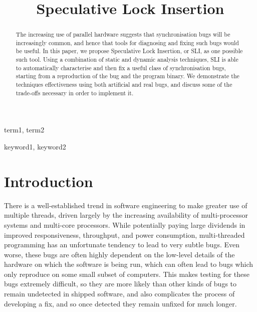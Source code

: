 \documentclass[10pt,twocolumn,preprint,natbib,authoryear]{sigplanconf}
\begin{document}
\copyrightdata{[to be supplied]} 


\title{Speculative Lock Insertion}

\authorinfo{}{}{}

\maketitle

\begin{abstract}

The increasing use of parallel hardware suggests that synchronisation
bugs will be increasingly common, and hence that tools for diagnosing
and fixing such bugs would be useful.  In this paper, we propose
Speculative Lock Insertion, or SLI, as one possible such tool.  Using
a combination of static and dynamic analysis techniques, SLI is able
to automatically characterise and then fix a useful class of
synchronisation bugs, starting from a reproduction of the bug and the
program binary.  We demonstrate the techniques effectiveness using
both artificial and real bugs, and discuss some of the trade-offs
necessary in order to implement it.

\end{abstract}


\terms
term1, term2

\keywords
keyword1, keyword2

\section{Introduction}

There is a well-established trend in software engineering to make
greater use of multiple threads, driven largely by the increasing
availability of multi-processor systems and multi-core processors.
While potentially paying large dividends in improved responsiveness,
throughput, and power consumption, multi-threaded programming has an
unfortunate tendency to lead to very subtle bugs.  Even worse, these
bugs are often highly dependent on the low-level details of the
hardware on which the software is being run, which can often lead to
bugs which only reproduce on some small subset of computers.  This
makes testing for these bugs extremely difficult, so they are more
likely than other kinds of bugs to remain undetected in shipped
software, and also complicates the process of developing a fix, and so
once detected they remain unfixed for much longer.
\end{document}
